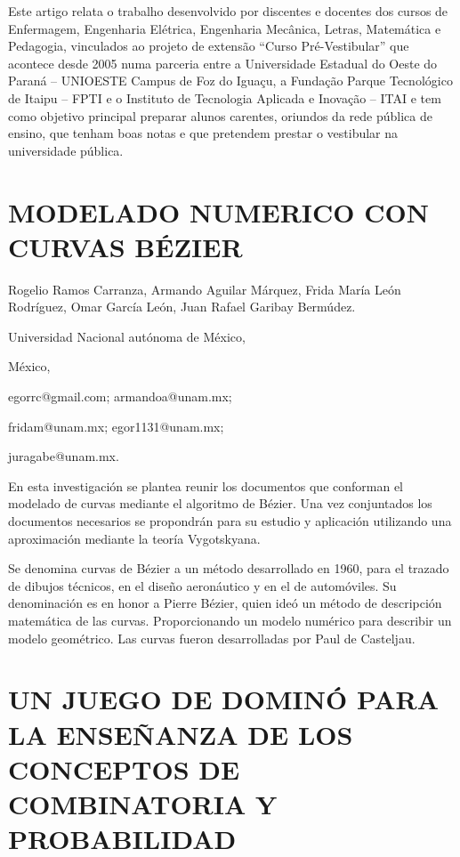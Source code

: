Este artigo relata o trabalho desenvolvido por discentes e docentes
dos cursos de Enfermagem, Engenharia Elétrica, Engenharia Mecânica,
Letras, Matemática e Pedagogia, vinculados ao projeto de extensão
“Curso Pré-Vestibular” que acontece desde 2005 numa parceria entre
a Universidade Estadual do Oeste do Paraná – UNIOESTE Campus de Foz
do Iguaçu, a Fundação Parque Tecnológico de Itaipu – FPTI e o Instituto
de Tecnologia Aplicada e Inovação – ITAI e tem como objetivo principal
preparar alunos carentes, oriundos da rede pública de ensino, que
tenham boas notas e que pretendem prestar o vestibular na universidade
pública.


\section{MODELADO NUMERICO CON CURVAS BÉZIER }

\begin{datos}

Rogelio Ramos Carranza, Armando Aguilar Márquez, Frida María León
Rodríguez, Omar García León, Juan Rafael Garibay Bermúdez.

Universidad Nacional autónoma de México,

México,

egorrc@gmail.com; armandoa@unam.mx;

fridam@unam.mx; egor1131@unam.mx;

juragabe@unam.mx. 

\end{datos}

En esta investigación se plantea reunir los documentos que conforman
el modelado de curvas mediante el algoritmo de Bézier. Una vez conjuntados
los documentos necesarios se propondrán para su estudio y aplicación
utilizando una aproximación mediante la teoría Vygotskyana. 

Se denomina curvas de Bézier a un método desarrollado en 1960, para
el trazado de dibujos técnicos, en el diseño aeronáutico y en el de
automóviles. Su denominación es en honor a Pierre Bézier, quien ideó
un método de descripción matemática de las curvas. Proporcionando
un modelo numérico para describir un modelo geométrico. Las curvas
fueron desarrolladas por Paul de Casteljau.


\section{UN JUEGO DE DOMINÓ PARA LA ENSEÑANZA DE LOS CONCEPTOS DE COMBINATORIA
Y PROBABILIDAD}


